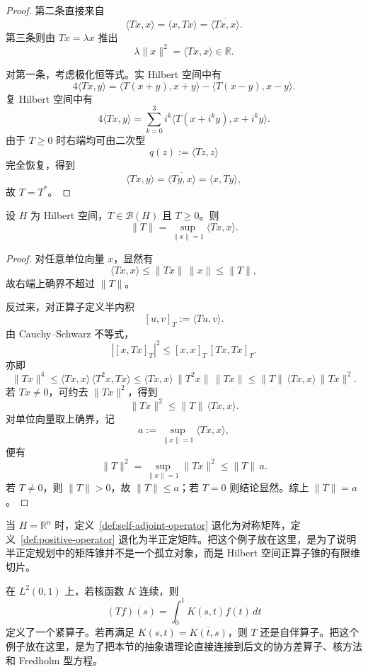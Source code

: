 \begin{proof}
第二条直接来自
\[
\langle Tx,x\rangle=\langle x,Tx\rangle=\overline{\langle Tx,x\rangle}.
\]
第三条则由 $Tx=\lambda x$ 推出
\[
\lambda \|x\|^2=\langle Tx,x\rangle\in \mathbb R.
\]

对第一条，考虑极化恒等式。实 Hilbert 空间中有
\[
4\langle Tx,y\rangle
=\langle T(x+y),x+y\rangle-\langle T(x-y),x-y\rangle.
\]
复 Hilbert 空间中有
\[
4\langle Tx,y\rangle
=\sum_{k=0}^{3} i^k\langle T(x+i^ky),x+i^ky\rangle.
\]
由于 $T\ge 0$ 时右端均可由二次型
\[
q(z):=\langle Tz,z\rangle
\]
完全恢复，得到
\[
\langle Tx,y\rangle=\overline{\langle Ty,x\rangle}=\langle x,Ty\rangle,
\]
故 $T=T^\ast$。
\end{proof}

\begin{proposition}[正算子的范数刻画]
设 $H$ 为 Hilbert 空间，$T\in \mathcal B(H)$ 且 $T\ge 0$。则
\[
\|T\|=\sup_{\|x\|=1}\langle Tx,x\rangle.
\]
\end{proposition}

\begin{proof}
对任意单位向量 $x$，显然有
\[
\langle Tx,x\rangle\le \|Tx\|\,\|x\|\le \|T\|,
\]
故右端上确界不超过 $\|T\|$。

反过来，对正算子定义半内积
\[
[u,v]_T:=\langle Tu,v\rangle.
\]
由 Cauchy--Schwarz 不等式，
\[
|[x,Tx]_T|^2\le [x,x]_T\,[Tx,Tx]_T.
\]
亦即
\[
\|Tx\|^4
\le \langle Tx,x\rangle \,\langle T^2x,Tx\rangle
\le \langle Tx,x\rangle\,\|T^2x\|\,\|Tx\|
\le \|T\|\,\langle Tx,x\rangle\,\|Tx\|^2.
\]
若 $Tx\neq 0$，可约去 $\|Tx\|^2$，得到
\[
\|Tx\|^2\le \|T\|\,\langle Tx,x\rangle.
\]
对单位向量取上确界，记
\[
a:=\sup_{\|x\|=1}\langle Tx,x\rangle,
\]
便有
\[
\|T\|^2=\sup_{\|x\|=1}\|Tx\|^2\le \|T\|\,a.
\]
若 $T\neq 0$，则 $\|T\|>0$，故 $\|T\|\le a$；若 $T=0$ 则结论显然。综上 $\|T\|=a$。
\end{proof}

\begin{example}\label{ex:symmetric-matrix-spectrum}
当 $H=\mathbb R^n$ 时，定义~\ref{def:self-adjoint-operator} 退化为对称矩阵，定义~\ref{def:positive-operator} 退化为半正定矩阵。把这个例子放在这里，是为了说明半正定规划中的矩阵锥并不是一个孤立对象，而是 Hilbert 空间正算子锥的有限维切片。
\end{example}

\begin{example}\label{ex:compact-integral-operator}
在 $L^2(0,1)$ 上，若核函数 $K$ 连续，则
\[
(Tf)(s)=\int_0^1 K(s,t)f(t)\,dt
\]
定义了一个紧算子。若再满足 $K(s,t)=\overline{K(t,s)}$，则 $T$ 还是自伴算子。把这个例子放在这里，是为了把本节的抽象谱理论直接连接到后文的协方差算子、核方法和 Fredholm 型方程。
\end{example}

